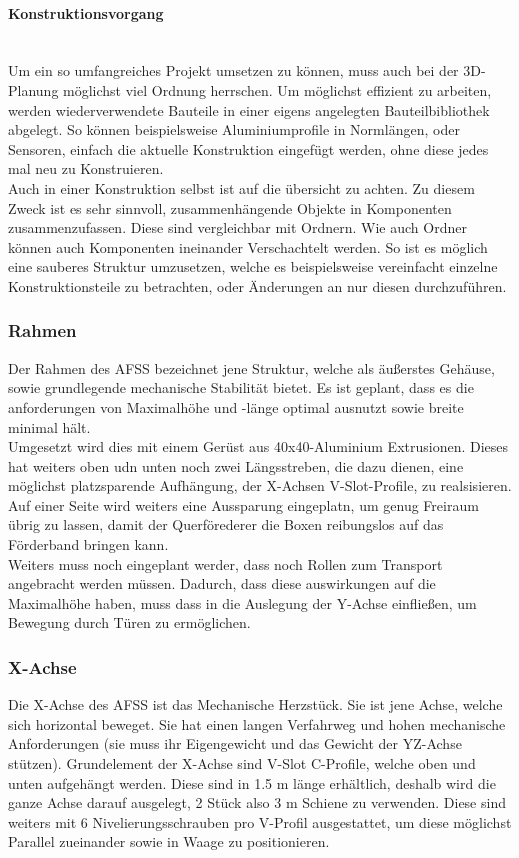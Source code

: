 \paragraph{Konstruktionsvorgang}\mbox{}\\
Um ein so umfangreiches Projekt umsetzen zu können, muss auch bei der 3D-Planung möglichst viel Ordnung herrschen. Um möglichst effizient zu arbeiten, werden wiederverwendete Bauteile in einer eigens angelegten Bauteilbibliothek abgelegt. So können beispielsweise Aluminiumprofile in Normlängen, oder Sensoren, einfach die aktuelle Konstruktion eingefügt werden, ohne diese jedes mal neu zu Konstruieren. \\
Auch in einer Konstruktion selbst ist auf die übersicht zu achten. Zu diesem Zweck ist es sehr sinnvoll, zusammenhängende Objekte in Komponenten zusammenzufassen. Diese sind vergleichbar mit Ordnern. Wie auch Ordner können auch Komponenten ineinander Verschachtelt werden. So ist es möglich eine sauberes Struktur umzusetzen, welche es beispielsweise vereinfacht einzelne Konstruktionsteile zu betrachten, oder Änderungen an nur diesen durchzuführen.

\subsubsection{Rahmen}

Der Rahmen des AFSS bezeichnet jene Struktur, welche als äußerstes Gehäuse, sowie grundlegende mechanische Stabilität bietet. Es ist geplant, dass es die anforderungen von Maximalhöhe und -länge optimal ausnutzt sowie breite minimal hält. \\
Umgesetzt wird dies mit einem Gerüst aus 40x40-Aluminium Extrusionen. Dieses hat weiters oben udn unten noch zwei Längsstreben, die dazu dienen, eine möglichst platzsparende Aufhängung, der X-Achsen V-Slot-Profile, zu realsisieren. Auf einer Seite wird weiters eine Aussparung eingeplatn, um genug Freiraum übrig zu lassen, damit der Querförederer die Boxen reibungslos auf das Förderband bringen kann.\\
Weiters muss noch eingeplant werder, dass noch Rollen zum Transport angebracht werden müssen. Dadurch, dass diese auswirkungen auf die Maximalhöhe haben, muss dass in die Auslegung der Y-Achse einfließen, um Bewegung durch Türen zu ermöglichen.

\subsubsection{X-Achse}
Die X-Achse des AFSS ist das Mechanische Herzstück. Sie ist jene Achse, welche sich horizontal beweget. Sie hat einen langen Verfahrweg und hohen mechanische Anforderungen (sie muss ihr Eigengewicht und das Gewicht der YZ-Achse stützen). 
Grundelement der X-Achse sind V-Slot C-Profile, welche oben und unten aufgehängt werden. Diese sind in 1.5 m länge erhältlich, deshalb wird die ganze Achse darauf ausgelegt, 2 Stück also 3 m Schiene zu verwenden. Diese sind weiters mit 6 Nivelierungsschrauben pro V-Profil ausgestattet, um diese möglichst Parallel zueinander sowie in Waage zu positionieren.

